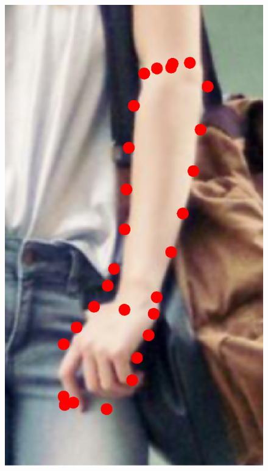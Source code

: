 \begin{figure}[!t]
    \hfill
    \includegraphics[height=\ofh]{resources/Annotation_Correction/Fittings/29.eps}
    \hfill

\end{figure}
